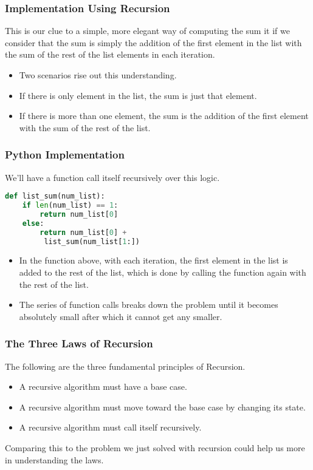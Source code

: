 \documentclass{beamer}
\begin{document}
\begin{frame}[fragile]
\frametitle{Implementation Using Recursion}
This is our clue to a simple, more elegant way of computing the sum it if we consider that the sum is simply the addition of the first element in the list with the sum of the rest of the list elements in each iteration.
\begin{itemize}
\item Two scenarios rise out this understanding.
\item If there is only element in the list, the sum is just that element.
\item If there is more than one element, the sum is the addition of the first element with the sum of the rest of the list. 
\end{itemize}

\end{frame}

\begin{frame}[fragile]
\frametitle{Python Implementation}
We'll have a function call itself recursively over this logic. 
\begin{lstlisting}[language=Python]
def list_sum(num_list):
    if len(num_list) == 1:
        return num_list[0]
    else:
        return num_list[0] +
         list_sum(num_list[1:])
\end{lstlisting}
\begin{itemize}
\item In the function above, with each iteration, the first element in the list is added to the rest of the list, which is done by calling the function again with the rest of the list.
\item The series of function calls breaks down the problem until it becomes absolutely small after which it cannot get any smaller.
\end{itemize}
\end{frame}

\begin{frame}
\frametitle{The Three Laws of Recursion}
The following are the three fundamental principles of Recursion.
\begin{itemize}
\item A recursive algorithm must have a base case.
\item A recursive algorithm must move toward the base case by changing its state.
\item A recursive algorithm must call itself recursively.
\end{itemize}
Comparing this to the problem we just solved with recursion could help us more in understanding the laws.
\end{frame}
\end{document}
